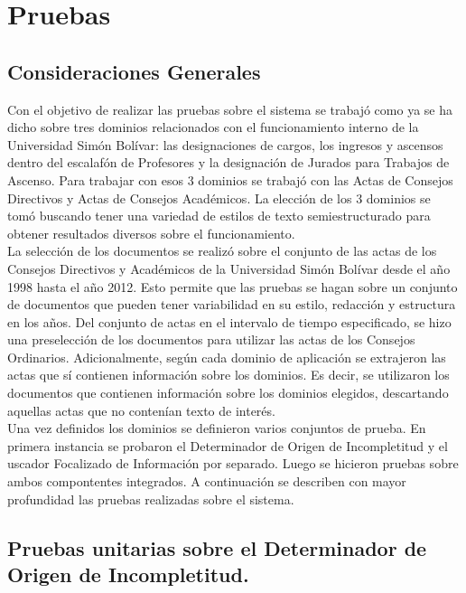 \chapter{Pruebas} \label{chap:pruebas}

\section{Consideraciones Generales} 

Con el objetivo de realizar las pruebas sobre el sistema se trabajó como ya se ha dicho sobre tres dominios relacionados con el funcionamiento interno de la Universidad Simón Bolívar: las designaciones de cargos, los ingresos y ascensos dentro del escalafón de Profesores y la designación de Jurados para Trabajos de Ascenso. Para trabajar con esos 3 dominios se trabajó con las Actas de Consejos Directivos y Actas de Consejos Académicos. La elección de los 3 dominios se tomó buscando tener una variedad de estilos de texto semiestructurado para obtener resultados diversos sobre el funcionamiento. \\

La selección de los documentos se realizó sobre el conjunto de las actas de los Consejos Directivos y Académicos de la Universidad Simón Bolívar desde el año 1998 hasta el año 2012. Esto permite que las pruebas se hagan sobre un conjunto de documentos que pueden tener variabilidad en su estilo, redacción y estructura en los años. Del conjunto de actas en el intervalo de tiempo especificado, se hizo una preselección de los documentos para utilizar las actas de los Consejos Ordinarios. Adicionalmente, según cada dominio de aplicación se extrajeron las actas que sí contienen información sobre los dominios. Es decir, se utilizaron los documentos que contienen información sobre los dominios elegidos, descartando aquellas actas que no contenían texto de interés.\\

Una vez definidos los dominios se definieron varios conjuntos de prueba. En primera instancia se probaron el Determinador de Origen de Incompletitud y el uscador Focalizado de Información por separado. Luego se hicieron pruebas sobre ambos compontentes integrados. A continuación se describen con mayor profundidad las pruebas realizadas sobre el sistema. \\

\section{Pruebas unitarias sobre el Determinador de Origen de Incompletitud.} 

